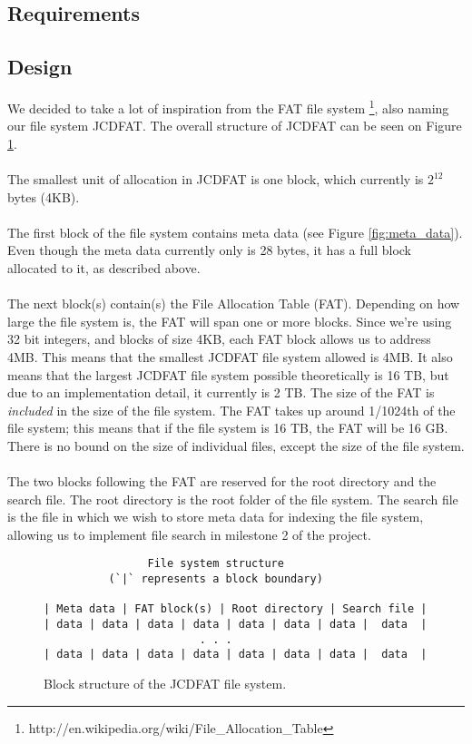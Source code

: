 \documentclass[11pt]{article}
\begin{document}
    \subsection{Requirements}

    \subsection{Design}
        We decided to take a lot of inspiration from the FAT file system
        \footnote{http://en.wikipedia.org/wiki/File\_Allocation\_Table}, also naming our file system JCDFAT. The overall structure of JCDFAT can be seen on Figure \ref{fig:block_structure}.\\
        \\
        The smallest unit of allocation in JCDFAT is one block, which currently
        is $2^{12}$ bytes (4KB).\\
        \\
        The first block of the file system contains meta data (see Figure \ref{fig:meta_data}). Even though the meta data currently only is 28 bytes, it has a full block allocated to it, as described above.\\
        \\
        The next block(s) contain(s) the File Allocation Table (FAT). Depending
        on how large the file system is, the FAT will span one or more blocks.
        Since we're using 32 bit integers, and blocks of size 4KB, each FAT
        block allows us to address 4MB. This means that the smallest JCDFAT file system allowed is 4MB. It also means that the largest JCDFAT file system possible theoretically is 16 TB, but due to an implementation detail, it currently is 2 TB. The size of the FAT is \emph{included} in the size of the file system. The FAT takes up around 1/1024th of the file system; this means that if the file system is 16 TB, the FAT will be 16 GB.\\
        There is no bound on the size of individual files, except the size of
        the file system.\\
        \\
        The two blocks following the FAT are reserved for the root directory and the search file. The root directory is the root folder of the file
        system. The search file is the file in which we wish to store meta data
        for indexing the file system, allowing us to implement file search in
        milestone 2 of the project.
        \begin{figure}[ht]
            \begin{verbatim}
                File system structure
          (`|` represents a block boundary)

| Meta data | FAT block(s) | Root directory | Search file |
| data | data | data | data | data | data | data |  data  |
                        . . .
| data | data | data | data | data | data | data |  data  |
            \end{verbatim}
            \caption{Block structure of the JCDFAT file system.}
            \label{fig:block_structure}
        \end{figure}
\end{document}

